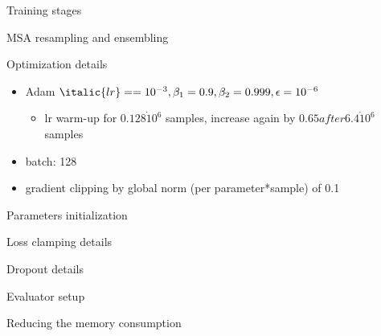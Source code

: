 \documentclass[presentation, smaller]{beamer}
\begin{document}
\begin{frame}[label={sec:org340807b}]{Training stages  \cite{jumperHighlyAccurateProtein2021}}
\end{frame}
\begin{frame}[label={sec:org80f01f2}]{MSA resampling and ensembling  \cite{jumperHighlyAccurateProtein2021}}
\end{frame}
\begin{frame}[label={sec:org235d885}]{Optimization details  \cite{jumperHighlyAccurateProtein2021}}
\begin{itemize}
\item Adam \(\italic{lr} == 10^{-3}, \beta_1 = 0.9, \beta_2 = 0.999, \epsilon = 10^{-6}\)
\begin{itemize}
\item lr warm-up for \(0.128 \dot 10^6\) samples, increase again by \(0.65 after 6.4 \dot 10^6\) samples
\end{itemize}
\item batch: 128
\item gradient clipping by global norm (per parameter*sample) of 0.1
\end{itemize}
\end{frame}

\begin{frame}[label={sec:org2fd971f}]{Parameters initialization  \cite{jumperHighlyAccurateProtein2021}}
\end{frame}
\begin{frame}[label={sec:org0ef0a38}]{Loss clamping details  \cite{jumperHighlyAccurateProtein2021}}
\end{frame}
\begin{frame}[label={sec:org5b70ff8}]{Dropout details  \cite{jumperHighlyAccurateProtein2021}}
\end{frame}
\begin{frame}[label={sec:orgcaf7669}]{Evaluator setup  \cite{jumperHighlyAccurateProtein2021}}
\end{frame}
\begin{frame}[label={sec:org37c67e0}]{Reducing the memory consumption  \cite{jumperHighlyAccurateProtein2021}}
\end{frame}
\end{document}
